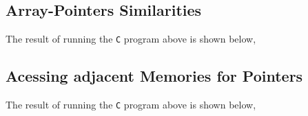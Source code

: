 \documentclass[a4paper, 12pt]{report}
\begin{document}
\begin{center}
\subsection{Array-Pointers Similarities}
\begin{comment}
\end{comment}

The result of running the \texttt{C} program above is shown below,


\subsection{Acessing adjacent Memories for Pointers}
\begin{comment}
\end{comment}

The result of running the \texttt{C} program above is shown below,


\end{center}
\end{document}
